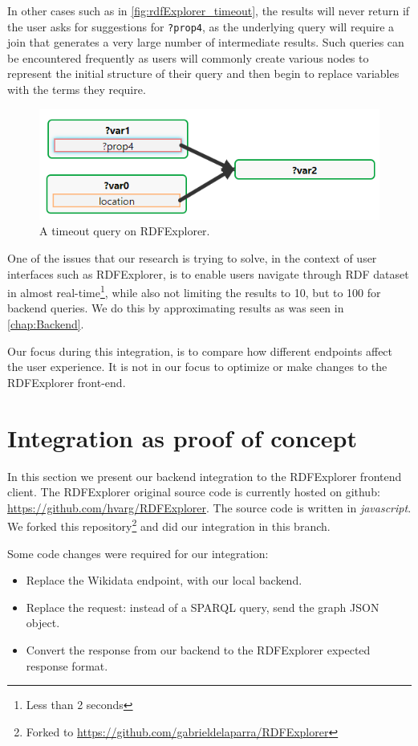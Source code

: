 In other cases such as in \autoref{fig:rdfExplorer_timeout}, the results will never return if the user asks for suggestions for \texttt{?prop4}, as the underlying query will require a join that generates a very large number of intermediate results. Such queries can be encountered frequently as users will commonly create various nodes to represent the initial structure of their query and then begin to replace variables with the terms they require. 

\begin{figure}[H]
    \centering
        \includegraphics[width=0.7\linewidth]{imagenes/timeout query.png}
        \caption{A timeout query on RDFExplorer.}
        \label{fig:rdfExplorer_timeout}
\end{figure}

One of the issues that our research is trying to solve, in the context of user interfaces such as RDFExplorer, is to enable users navigate through RDF dataset in almost real-time\footnote{Less than 2 seconds}, while also not limiting the results to 10, but to 100 for backend queries. We do this by approximating results as was seen in  \autoref{chap:Backend}.

Our focus during this integration, is to compare how different endpoints affect the user experience. It is not in our focus to optimize or make changes to the RDFExplorer  front-end.

\section{Integration as proof of concept}

In this section we present our backend integration to the RDFExplorer frontend client. The RDFExplorer original source code is currently hosted on github: \url{https://github.com/hvarg/RDFExplorer}. The source code is written in \textit{javascript}. We forked this repository\footnote{Forked to \url{https://github.com/gabrieldelaparra/RDFExplorer}} and did our integration in this branch. 

Some code changes were required for our integration: 
\begin{itemize}
    \item Replace the Wikidata endpoint, with our local backend.
    \item Replace the request: instead of a SPARQL query, send the graph JSON object.
    \item Convert the response from our backend to the RDFExplorer expected response format.
\end{itemize} 

